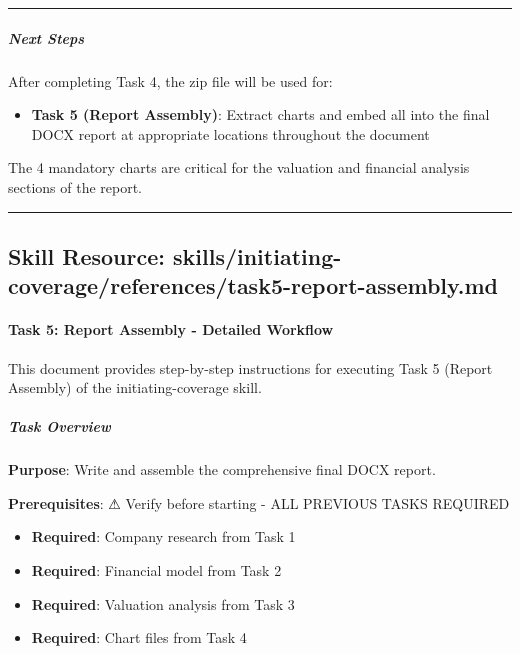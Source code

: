 \documentclass[11pt]{article}
\begin{document}
\vspace{0.5em}\hrule\vspace{0.5em}

\subparagraph{Next Steps}\mbox{}\par

After completing Task 4, the zip file will be used for:

\begin{itemize}[leftmargin=*,itemsep=2pt,topsep=2pt]
\item {} \textbf{Task 5 (Report Assembly)}: Extract charts and embed all into the final DOCX report at appropriate locations throughout the document
\end{itemize}

The 4 mandatory charts are critical for the valuation and financial analysis sections of the report.


\vspace{0.8em}\hrule\vspace{0.8em}

\subsection{Skill Resource: skills/initiating-coverage/references/task5-report-assembly.md}\label{file:skills-initiating-coverage-references-task5-report-assembly-md}

\paragraph{Task 5: Report Assembly - Detailed Workflow}\mbox{}\par

This document provides step-by-step instructions for executing Task 5 (Report Assembly) of the initiating-coverage skill.


\subparagraph{Task Overview}\mbox{}\par

\textbf{Purpose}: Write and assemble the comprehensive final DOCX report.


\textbf{Prerequisites}: ⚠ Verify before starting - ALL PREVIOUS TASKS REQUIRED

\begin{itemize}[leftmargin=*,itemsep=2pt,topsep=2pt]
\item {} \textbf{Required}: Company research from Task 1
\item {} \textbf{Required}: Financial model from Task 2
\item {} \textbf{Required}: Valuation analysis from Task 3
\item {} \textbf{Required}: Chart files from Task 4
\end{itemize}
\end{document}
